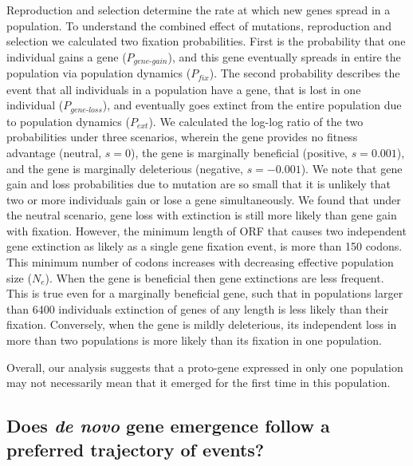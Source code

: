 \documentclass[12pt,a4paper]{article}
\newcommand{\cmnt}[1]{{\color{purple} #1}}
\begin{document}
\cmnt{Reproduction and selection determine the rate at which new genes spread in a population. To understand the combined effect of mutations, reproduction and selection we calculated two fixation probabilities. First is the probability that one individual gains a gene ($P_\textit{gene-gain}$), and this gene eventually spreads in entire the population via population dynamics ($P_\textit{fix}$). The second probability describes the event that all individuals in a population have a gene, that is lost in one individual ($P_\textit{gene-loss}$), and eventually goes extinct from the entire population due to population dynamics ($P_\textit{ext}$). We calculated the log-log ratio of the two probabilities under three scenarios, wherein the gene provides no fitness advantage (neutral, $s=0$), the gene is marginally beneficial (positive, $s = 0.001$), and the gene is marginally deleterious (negative, $s = -0.001$). We note that gene gain and loss probabilities due to mutation are so small that it is unlikely that two or more individuals gain or lose a gene simultaneously. We found that under the neutral scenario, gene loss with extinction is still more likely than gene gain with fixation. However, the minimum length of ORF that causes two independent gene extinction as likely as a single gene fixation event, is more than 150 codons. This minimum number of codons increases with decreasing effective population size ($N_e$). When the gene is beneficial then gene extinctions are less frequent. This is true even for a marginally beneficial gene, such that in populations larger than 6400 individuals extinction of genes of any length is less likely than their fixation. Conversely, when the gene is mildly deleterious, its independent loss in more than two populations is more likely than its fixation in one population.}

Overall, our analysis suggests that a proto-gene expressed in only one population may not necessarily mean that it emerged for the first time in this population. 

\subsection{Does \textit{de novo} gene emergence follow a preferred trajectory of events?}
\end{document}
